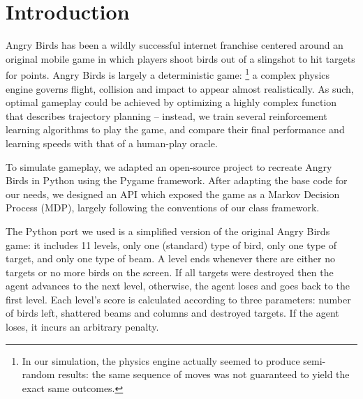 \documentclass[fleqn,10pt]{SelfArx} %
\affiliation{\textsuperscript{1}\textit{Department of Management Science and Engineering, Stanford University, California,  United States}} %
\begin{document}
\flushbottom %

\maketitle %

\tableofcontents %

\thispagestyle{empty} %


\section*{Introduction} %


Angry Birds has been a wildly successful internet franchise centered around an original mobile game in which players shoot birds out of a slingshot to hit targets for points. Angry Birds is largely a deterministic game: %
\footnote{In our simulation, the physics engine actually seemed to produce semi-random results: the same sequence of moves was not guaranteed to yield the exact same outcomes.} %
a complex physics engine governs flight, collision and impact to appear almost realistically. As such, optimal gameplay could be achieved by optimizing a highly complex function that describes trajectory planning -- instead, we train several reinforcement learning algorithms to play the game, and compare their final performance and learning speeds with that of a human-play oracle.

To simulate gameplay, we adapted an open-source project to recreate Angry Birds in Python \cite{estevaofon} using the Pygame framework. After adapting the base code for our needs, we designed an API which exposed the game as a Markov Decision Process (MDP), largely following the conventions of our class framework.

The Python port we used is a simplified version of the original Angry Birds game: it includes 11 levels, only one (standard) type of bird, only one type of target, and only one type of beam. A level ends whenever there are either no targets or no more birds on the screen. If all targets were destroyed then the agent advances to the next level, otherwise, the agent loses and goes back to the first level. Each level’s score is calculated according to three parameters: number of birds left, shattered beams and columns and destroyed targets. If the agent loses, it incurs an arbitrary penalty. 
\end{document}
